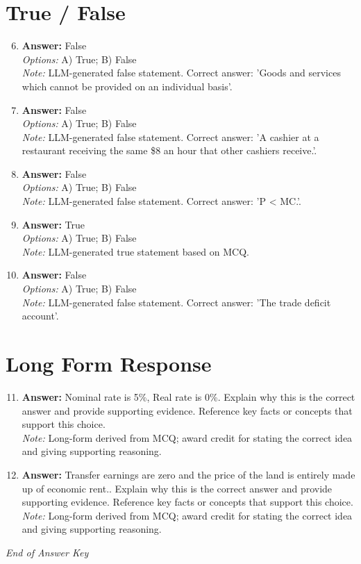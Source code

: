 \documentclass[12pt]{article}
\begin{document}
\section*{True / False}
\begin{enumerate}[label=\arabic*.]
\setcounter{enumi}{5}
\item \textbf{Answer:} False
\\ \textit{Options:} A) True; B) False
\\ \textit{Note:} LLM-generated false statement. Correct answer: 'Goods and services which cannot be provided on an individual basis'.
\item \textbf{Answer:} False
\\ \textit{Options:} A) True; B) False
\\ \textit{Note:} LLM-generated false statement. Correct answer: 'A cashier at a restaurant receiving the same \$8 an hour that other cashiers receive.'.
\item \textbf{Answer:} False
\\ \textit{Options:} A) True; B) False
\\ \textit{Note:} LLM-generated false statement. Correct answer: 'P \textless{} MC.'.
\item \textbf{Answer:} True
\\ \textit{Options:} A) True; B) False
\\ \textit{Note:} LLM-generated true statement based on MCQ.
\item \textbf{Answer:} False
\\ \textit{Options:} A) True; B) False
\\ \textit{Note:} LLM-generated false statement. Correct answer: 'The trade deficit account'.
\end{enumerate}

\section*{Long Form Response}
\begin{enumerate}[label=\arabic*.]
\setcounter{enumi}{10}
\item \textbf{Answer:} Nominal rate is 5\%, Real rate is 0\%. Explain why this is the correct answer and provide supporting evidence. Reference key facts or concepts that support this choice.
\\ \textit{Note:} Long-form derived from MCQ; award credit for stating the correct idea and giving supporting reasoning.
\item \textbf{Answer:} Transfer earnings are zero and the price of the land is entirely made up of economic rent.. Explain why this is the correct answer and provide supporting evidence. Reference key facts or concepts that support this choice.
\\ \textit{Note:} Long-form derived from MCQ; award credit for stating the correct idea and giving supporting reasoning.
\end{enumerate}

\vfill
\noindent\textit{End of Answer Key}
\end{document}
